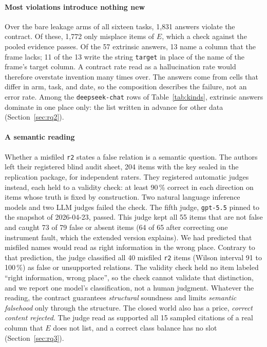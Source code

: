 \documentclass[journal]{IEEEtran}
\begin{document}
\paragraph{Most violations introduce nothing new}
Over the bare leakage arms of all sixteen tasks, 1{,}831 answers violate the
contract. Of these, 1{,}772 only misplace items of $E$, which a check against the
pooled evidence passes. Of the 57 extrinsic answers, 13 name a column that the
frame lacks; 11 of the 13 write the string \texttt{target} in place of the name
of the frame's target column. A contract rate read as a hallucination rate would
therefore overstate invention many times over. The answers come from cells that
differ in arm, task, and date, so the composition describes the failure, not an
error rate. Among the \texttt{deepseek-chat} rows of Table~\ref{tab:kinds},
extrinsic answers dominate in one place only: the list written in advance for
other data (Section~\ref{sec:rq2}).

\paragraph{A semantic reading}
Whether a misfiled \texttt{r2} states a false relation is a semantic question.
The authors left their registered blind audit sheet, 204 items with the key
sealed in the replication package, for independent raters. They registered
automatic judges instead, each held to a validity check: at least 90\,\% correct
in each direction on items whose truth is fixed by construction. Two natural
language inference models and two LLM judges failed the check. The fifth judge,
\texttt{gpt-5.5} pinned to the snapshot of 2026-04-23, passed. This judge kept
all 55 items that are not false and caught 73 of 79 false or absent items (64 of
65 after correcting one instrument fault, which the extended version explains).
We had predicted that misfiled names would read as right information in the
wrong place. Contrary to that prediction, the judge classified all 40 misfiled
\texttt{r2} items (Wilson interval 91 to 100\,\%) as false or unsupported
relations. The validity check held no item labeled ``right information, wrong
place'', so the check cannot validate that distinction, and we report one
model's classification, not a human judgment. Whatever the reading, the contract
guarantees \emph{structural} soundness and limits \emph{semantic falsehood} only
through the structure. The closed world also has a price, \emph{correct content
rejected}. The judge read as supported all 15 sampled citations of a real column
that $E$ does not list, and a correct class balance has no slot
(Section~\ref{sec:rq3}).
\end{document}
